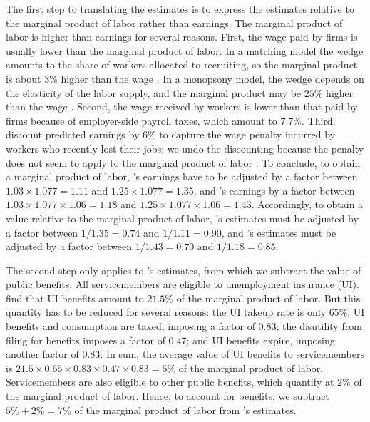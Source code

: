 \documentclass[letterpaper,12pt,leqno]{article}
\begin{document}
The first step to translating the estimates is to express the estimates relative to the marginal product of labor rather than earnings. The marginal product of labor is higher than earnings for several reasons. First, the wage paid by firms is usually lower than the marginal product of labor. In a matching model the wedge amounts to the share of workers allocated to recruiting, so the marginal product is about $3\%$ higher than the wage . In a monopsony model, the wedge depends on the elasticity of the labor supply, and the marginal product may be $25\%$ higher than the wage . Second, the wage received by workers is lower than that paid by firms because of employer-side payroll taxes, which amount to $7.7\%$. Third,  discount predicted earnings by $6\%$ to capture the wage penalty incurred by workers who recently lost their jobs; we undo the discounting because the penalty does not seem to apply to the marginal product of labor . To conclude, to obtain a marginal product of labor, 's earnings have to be adjusted by a factor between $1.03\times 1.077 = 1.11$ and $1.25 \times 1.077 = 1.35$, and 's earnings by a factor between $1.03\times 1.077 \times 1.06 = 1.18$ and $1.25 \times 1.077 \times 1.06 = 1.43$. Accordingly, to obtain a value relative to the marginal product of labor, 's estimates must be adjusted by a factor between $1/1.35 = 0.74$ and $1/1.11 = 0.90$, and 's estimates must be adjusted by a factor between $1/1.43 = 0.70$ and $1/1.18 = 0.85$. 

The second step only applies to 's estimates, from which we subtract the value of public benefits. All servicemembers are eligible to unemployment insurance (UI).  find that UI benefits amount to $21.5\%$ of the marginal product of labor. But this quantity has to be reduced for several reasons: the UI takeup rate is only $65\%$; UI benefits and consumption are taxed, imposing a factor of $0.83$; the disutility from filing for benefits imposes a factor of $0.47$; and UI benefits expire, imposing another factor of $0.83$. In sum, the average value of UI benefits to servicemembers is $21.5 \times 0.65 \times 0.83 \times 0.47 \times 0.83 = 5\%$ of the marginal product of labor. Servicemembers are also eligible to other public benefits, which  quantify at $2\%$ of the marginal product of labor. Hence, to account for benefits, we subtract $5\%+2\% =7\%$ of the marginal product of labor from 's estimates.
\end{document}
